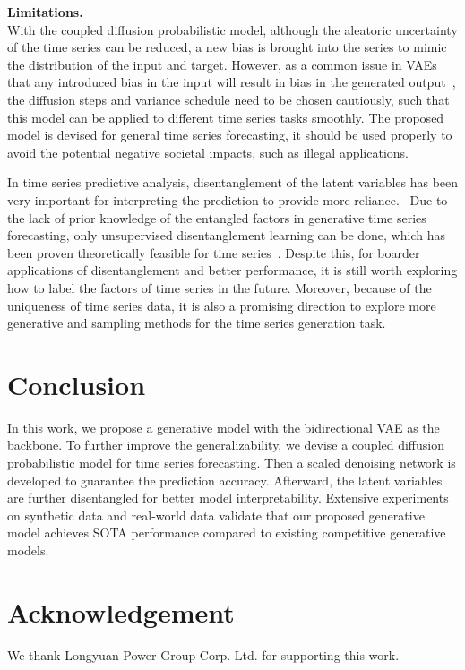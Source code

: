 \textbf{Limitations.~} %
\\
With the coupled diffusion probabilistic model, although the aleatoric uncertainty of the time series can be reduced, a new bias is brought into the series to mimic the distribution of the input and target.
However, as a common issue in VAEs that any introduced bias in the input will result in bias in the generated output~\cite{von2021self}, the diffusion steps and variance schedule need to be chosen cautiously, such that this model can be applied to different time series tasks smoothly. 
The proposed model is devised for general time series forecasting, it should be used properly to avoid the potential negative societal impacts, such as illegal applications. 

In time series predictive analysis, disentanglement of the latent variables has been very important for interpreting the prediction to provide more reliance.~%
Due to the lack of prior knowledge of the entangled factors in generative time series forecasting, only unsupervised disentanglement learning can be done, which has been proven theoretically feasible for time series~\cite{li2021learning}. 
Despite this, for boarder applications of disentanglement and better performance, it is still worth exploring how to label the factors of time series in the future.  
Moreover, because of the uniqueness of time series data, it is also a promising direction to explore more generative and sampling methods for the time series generation task. 

\section{Conclusion} \label{conclusion}

In this work, we propose a generative model with the bidirectional VAE as the backbone. 
To further improve the generalizability, we devise a coupled diffusion probabilistic model for time series forecasting. 
Then a scaled denoising network is developed to guarantee the prediction accuracy. 
Afterward, the latent variables are further disentangled for better model interpretability. 
Extensive experiments on synthetic data and real-world data validate that our proposed generative model achieves SOTA performance compared to existing competitive generative models.

\section*{Acknowledgement}

We thank Longyuan Power Group Corp. Ltd. for supporting this work.  

\newpage

\newpage

